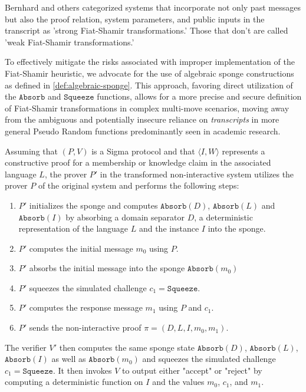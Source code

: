 Bernhard and others categorized systems that incorporate not only past messages but also the proof relation, system parameters, and public inputs in the transcript as 'strong Fiat-Shamir transformations.' Those that don't are called 'weak Fiat-Shamir transformations.'

To effectively mitigate the risks associated with improper implementation of the Fiat-Shamir heuristic, we advocate for the use of algebraic sponge constructions as defined in \ref{def:algebraic-sponge}. This approach, favoring direct utilization of the $\mathtt{Absorb}$ and $\mathtt{Squeeze}$ functions, allows for a more precise and secure definition of Fiat-Shamir transformations in complex multi-move scenarios, moving away from the ambiguous and potentially insecure reliance on \textit{transcripts} in more general Pseudo Random functions predominantly seen in academic research.


Assuming that $(P,V)$ is a Sigma protocol and that $\langle I, W\rangle$ represents a constructive proof for a membership or knowledge claim in the associated language $L$, the prover $P'$ in the transformed non-interactive system utilizes the prover $P$ of the original system and performs the following steps:
\begin{enumerate}
\label{def_sigma-model-fiat-shamir}
\item $P'$ initializes the sponge and computes $\mathtt{Absorb}(D)$, $\mathtt{Absorb}(L)$ and $\mathtt{Absorb}(I)$ by absorbing a domain separator $D$, a deterministic representation of the language $L$ and the instance $I$ into the sponge.
\item $P'$ computes the initial message $m_0$ using $P$.
\item $P'$ absorbs the initial message into the sponge $\mathtt{Absorb}(m_0)$
\item $P'$ squeezes the simulated challenge $c_1=\mathtt{Squeeze}$.
\item $P'$ computes the response message $m_1$ using $P$ and $c_1$.
\item $P'$ sends the non-interactive proof $\pi=(D,L,I,m_0,m_1)$.
\end{enumerate}
The verifier $V'$ then computes the same sponge state $\mathtt{Absorb}(D)$, $\mathtt{Absorb}(L)$, $\mathtt{Absorb}(I)$ as well as $\mathtt{Absorb}(m_0)$ and squeezes the simulated challenge $c_1=\mathtt{Squeeze}$. It then invokes $V$ to output either "accept" or "reject" by computing a deterministic function on $I$ and the values $m_0$, $c_1$, and $m_1$.


